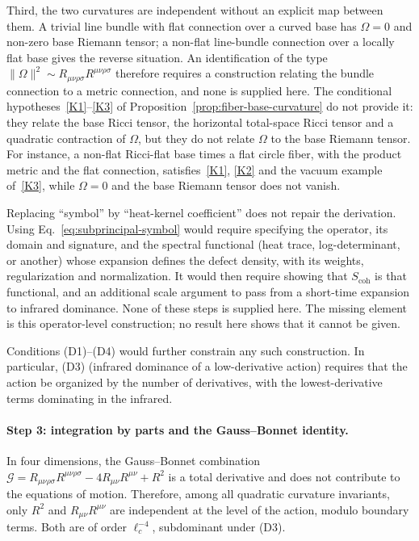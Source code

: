     Third, the two curvatures are independent without an explicit map between them.
    A trivial line bundle with flat connection over a curved base has $\Omega = 0$ and non-zero base Riemann
    tensor; a non-flat line-bundle connection over a locally flat base gives the reverse situation.
    An identification of the type $\|\Omega\|^2 \sim R_{\mu\nu\rho\sigma}R^{\mu\nu\rho\sigma}$ therefore requires
    a construction relating the bundle connection to a metric connection, and none is supplied here.
    The conditional hypotheses~\ref{K1}--\ref{K3} of Proposition~\ref{prop:fiber-base-curvature} do not provide it:
    they relate the base Ricci tensor, the horizontal total-space Ricci tensor and a quadratic contraction of
    $\Omega$, but they do not relate $\Omega$ to the base Riemann tensor.
    For instance, a non-flat Ricci-flat base times a flat circle fiber, with the product metric and the flat
    connection, satisfies~\ref{K1}, \ref{K2} and the vacuum example of~\ref{K3}, while $\Omega = 0$ and the base
    Riemann tensor does not vanish.

    Replacing ``symbol'' by ``heat-kernel coefficient'' does not repair the derivation.
    Using Eq.~\eqref{eq:subprincipal-symbol} would require specifying the operator, its domain and signature, and
    the spectral functional (heat trace, log-determinant, or another) whose expansion defines the defect density,
    with its weights, regularization and normalization.
    It would then require showing that $S_{\mathrm{coh}}$ is that functional, and an additional scale argument to
    pass from a short-time expansion to infrared dominance.
    None of these steps is supplied here.
    The missing element is this operator-level construction; no result here shows that it cannot be given.

    Conditions (D1)--(D4) would further constrain any such construction.
    In particular, (D3) (infrared dominance of a low-derivative action) requires that
    the action be organized by the number of derivatives, with the lowest-derivative
    terms dominating in the infrared.

  \paragraph{Step 3: integration by parts and the Gauss--Bonnet identity.}
    In four dimensions, the Gauss--Bonnet combination
    $\mathcal{G} = R_{\mu\nu\rho\sigma} R^{\mu\nu\rho\sigma} - 4 R_{\mu\nu} R^{\mu\nu}
    + R^2$ is a total derivative and does not contribute to the equations of motion.
    Therefore, among all quadratic curvature invariants, only $R^2$ and
    $R_{\mu\nu} R^{\mu\nu}$ are independent at the level of the action, modulo
    boundary terms.
    Both are of order $\ell_c^{-4}$, subdominant under (D3).

